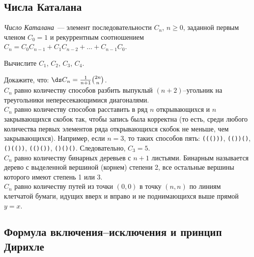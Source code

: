 \subsection*{Числа Каталана}

\emph{Число Каталана}~--- элемент последовательности $C_n$, $n \geq 0$, заданной
первым членом $C_0 = 1$ и рекуррентным соотношением
\(
    C_n
=
    C_0 C_{n - 1}
    +
    C_1 C_{n - 2}
    +
    \ldots
    +
    C_{n - 1} C_0
\).

\begin{problems}

\item
Вычислите $C_1$, $C_2$, $C_3$, $C_4$.

\item
Докажите, что:
\quad
\sbp
\(\ds
    C_n
=
    \frac{1}{n + 1}
    \binom{2n}{n}
\).
\\[0.5ex]
\sbp
$C_n$ равно количеству способов разбить выпуклый $(n + 2)$--угольник на
треугольники непересекающимися диагоналями.
\\
\sbp
$C_n$ равно количеству способов расставить в ряд $n$ открывающихся и $n$
закрывающихся скобок так, чтобы запись была корректна
(то есть, среди любого количества первых элементов ряда открывающихся скобок не
меньше, чем закрывающихся).
Например, если $n = 3$, то таких способов пять:
\mbox{\tt((()))}, \mbox{\tt(())()}, \mbox{\tt()(())}, \mbox{\tt(()())},
\mbox{\tt()()()}.
Следовательно, $C_3 = 5$.
\\
\sbp
$C_n$ равно количеству бинарных деревьев с $n + 1$ листьями.
Бинарным называется дерево с выделенной вершиной (корнем) степени 2, все
остальные вершины которого имеют степень 1 или 3.
\\
\sbp
$C_n$ равно количеству путей из точки $(0, 0)$ в точку $(n, n)$ по линиям
клетчатой бумаги, идущих вверх и вправо и не поднимающихся выше прямой $y = x$.

\let\ds\undefined

\end{problems}

\subsection*{Формула включения--исключения и принцип Дирихле}

